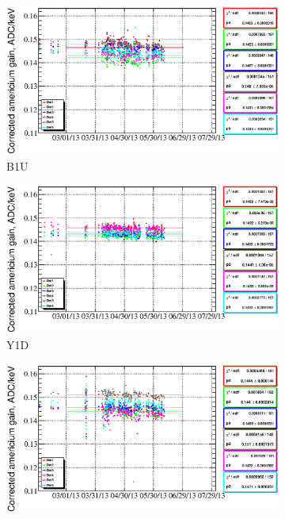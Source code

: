 \documentclass[a4paper,12pt]{article}
\begin{document}
\begin{figure}
%
\begin{subfigure}[t]{0.49\textwidth}
\includegraphics[width=\textwidth]{gfx/run13_alpha_study_novoltagevariation/B1U/c_chAmGainCorrected_by_day_B1U.eps}
\caption{B1U}
\end{subfigure}
%
\hfill
%
\begin{subfigure}[t]{0.49\textwidth}
\includegraphics[width=\textwidth]{gfx/run13_alpha_study_novoltagevariation/Y1D/c_chAmGainCorrected_by_day_Y1D.eps}
\caption{Y1D}
\end{subfigure}
%
\begin{subfigure}[t]{0.49\textwidth}
\includegraphics[width=\textwidth]{gfx/run13_alpha_study_novoltagevariation/B2D/c_chAmGainCorrected_by_day_B2D.eps}

\end{subfigure}
\end{figure}
\end{document}
